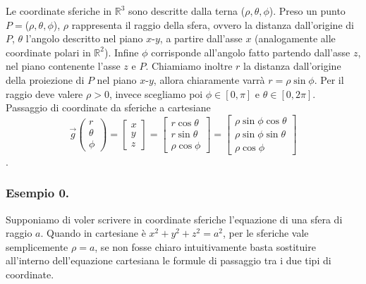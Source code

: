 \documentclass[10pt]{article}
\theoremstyle{plain}
\theoremstyle{definition}
\begin{document}
Le coordinate sferiche in $\mathbb{R}^3$ sono descritte dalla terna ($\rho, \theta , \phi$). Preso un punto $P=$($\rho, \theta , \phi$),  $\rho$ rappresenta il raggio della sfera, ovvero la distanza dall'origine di $P$, $\theta$ l'angolo descritto nel piano $x$-$y$, a partire dall'asse $x$ (analogamente alle coordinate polari in $\mathbb{R}^2$). Infine $\phi$ corrisponde all'angolo fatto partendo dall'asse $z$, nel piano contenente l'asse $z$ e $P$. Chiamiamo inoltre $r$ la distanza dall'origine della proiezione di $P$ nel piano $x$-$y$, allora chiaramente varrà $r=\rho \sin{\phi}$. Per il raggio deve valere $\rho >0$, invece scegliamo poi $\phi \in [0, \pi]$ e $\theta \in [0, 2\pi].$ 
\\ Passaggio di coordinate da sferiche a cartesiane
$$\vec{g} \left(\begin{matrix}  r \\ \theta \\ \phi  \end{matrix}\right) = \begin{bmatrix} x \\ y \\ z \end{bmatrix} = \begin{bmatrix} r \cos\theta \\ r \sin\theta \\ \rho \cos\phi \end{bmatrix}
 = \begin{bmatrix} 
 \rho \sin\phi \cos\theta \\ 
 \rho \sin\phi \sin\theta \\ 
 \rho \cos\phi 
 \end{bmatrix}$$.
\subsubsection{Esempio 0.}
Supponiamo di voler scrivere in coordinate sferiche l'equazione di una sfera di raggio $a$. Quando in cartesiane è $x^2+y^2+z^2=a^2$, per le sferiche vale semplicemente $\rho =a$, se non fosse chiaro intuitivamente basta sostituire all'interno dell'equazione cartesiana le formule di passaggio tra i due tipi di coordinate.
\end{document}
